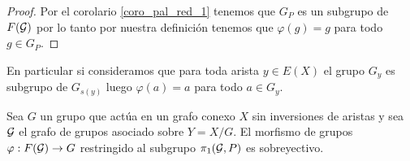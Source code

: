 \documentclass[tesis.tex]{subfiles}
\begin{document}
\begin{proof}
	Por el corolario \ref{coro_pal_red_1} tenemos que $G_{P}$ es un subgrupo de $F({\cal G})$ por lo tanto por nuestra definición tenemos que $\varphi(g) = g$ para todo $g \in G_{P}$.
\end{proof}

En particular si consideramos que para toda arista $y \in E(X)$ el grupo $G_y$ es subgrupo de $G_{s(y)}$ luego $\varphi(a) = a$ para todo $a \in G_{y}$.

\begin{prop}\label{prop_morf_grp_restr_sobre}
	Sea $G$ un grupo que actúa en un grafo conexo $X$ sin inversiones de aristas y sea ${\cal G}$ el grafo de grupos asociado sobre $Y = X / G$.
	El morfismo de grupos $\varphi: F({\cal G}) \to G$ restringido al subgrupo $\pi_1({\cal G}, P)$ es sobreyectivo.
\end{prop}
\end{document}
